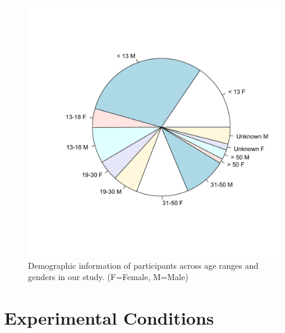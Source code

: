 \begin{figure}[tb]
\centering
\includegraphics[width=0.55\columnwidth,trim=10 10 10 0, clip]{AgeGenderDistribution} 
\caption{ Demographic information of participants across age ranges and genders in our study. (F=Female, M=Male)}%
\label{demographic}
\end{figure}


\section{Experimental Conditions}
\label{sec:cons}

